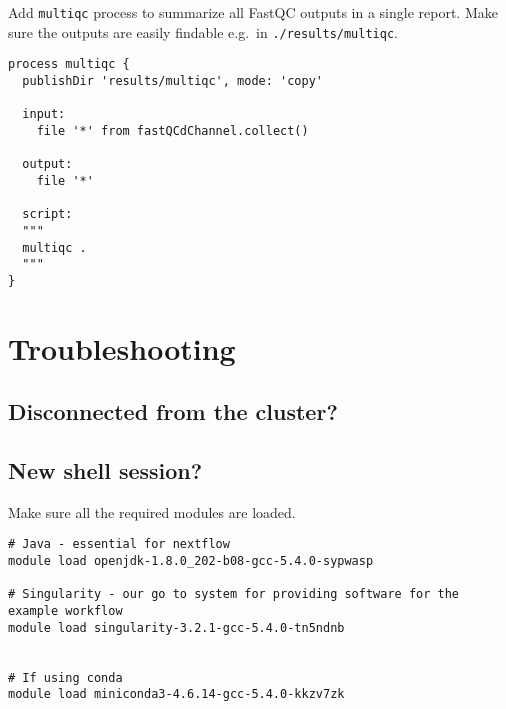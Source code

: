 \begin{bonus}
Add \texttt{multiqc} process to summarize all FastQC outputs in a single report.
Make sure the outputs are easily findable e.g.\ in \texttt{./results/multiqc}.
\begin{answer}
\begin{lstlisting}
process multiqc {
  publishDir 'results/multiqc', mode: 'copy'
  
  input: 
    file '*' from fastQCdChannel.collect()

  output:
    file '*'

  script:
  """
  multiqc .
  """
}
\end{lstlisting}
\end{answer}
\end{bonus}


%



\section{Troubleshooting}

\subsection{Disconnected from the cluster?}  

\subsection{New shell session?}

Make sure all the required modules are loaded. 

\begin{steps}
\begin{lstlisting}
# Java - essential for nextflow
module load openjdk-1.8.0_202-b08-gcc-5.4.0-sypwasp 

# Singularity - our go to system for providing software for the example workflow
module load singularity-3.2.1-gcc-5.4.0-tn5ndnb


# If using conda 
module load miniconda3-4.6.14-gcc-5.4.0-kkzv7zk
\end{lstlisting}
\end{steps}


